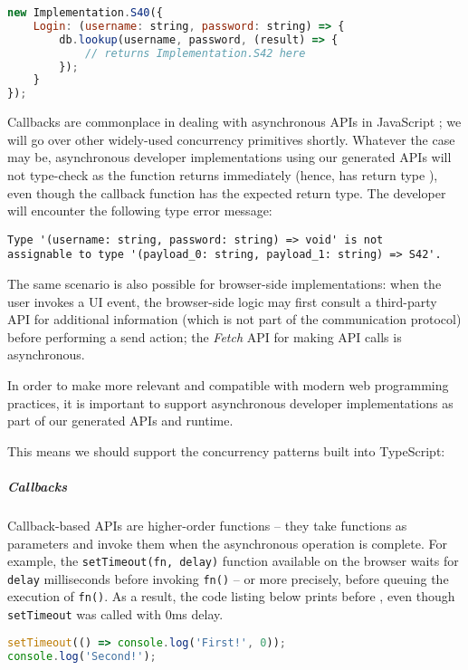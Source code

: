 \begin{lstlisting}[language=javascript]
new Implementation.S40({
	Login: (username: string, password: string) => {
		db.lookup(username, password, (result) => {
			// returns Implementation.S42 here
		});
	}
});
\end{lstlisting}

Callbacks are commonplace in dealing with 
asynchronous APIs in JavaScript
\cite{CallbackHell}; we will go over other widely-used
concurrency primitives shortly.
Whatever the case may be, asynchronous developer implementations
using our generated APIs will not type-check as the function
returns immediately (hence, has return type ),
even though the callback function has the expected return type.
The developer will encounter the following type error message:

\begin{lstlisting}[tabsize=2,numbers=none]
Type '(username: string, password: string) => void' is not 
assignable to type '(payload_0: string, payload_1: string) => S42'.
\end{lstlisting}

The same scenario is also possible for browser-side implementations:
when the user invokes a UI event, the browser-side logic
may first consult a third-party API for additional information
(which is not part of the communication protocol)
before performing a send action; the \textit{Fetch} API \cite{Fetch}
for making API calls is asynchronous.

In order to make \codegen more relevant and compatible
with modern web programming practices, it is important to
support asynchronous developer implementations as part of our
generated APIs and runtime. 

This means we should support
the concurrency patterns built into TypeScript:

\subparagraph{Callbacks}
Callback-based APIs are higher-order functions -- they take functions
as parameters and invoke them when the asynchronous operation is complete.
For example,
the \texttt{setTimeout(fn, delay)} function available on the browser
waits for \texttt{delay} milliseconds before invoking \texttt{fn()} --
or more precisely, before queuing the execution of \texttt{fn()}.
As a result, the code listing below prints 
before , even though \texttt{setTimeout}
was called with 0ms delay.

\begin{lstlisting}[language=javascript,numbers=none]
setTimeout(() => console.log('First!', 0));
console.log('Second!');
\end{lstlisting}

